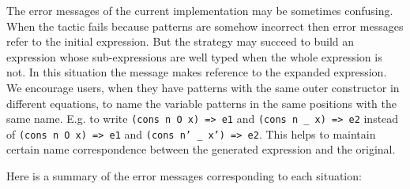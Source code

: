The error messages of the current implementation may be sometimes
confusing.  When the tactic fails because patterns are somehow
incorrect then error messages refer to the initial expression. But the
strategy may succeed to build an expression whose sub-expressions are
well typed when the whole expression is not. In this situation the
message makes reference to the expanded expression.  We encourage
users, when they have patterns with the same outer constructor in
different equations, to name the variable patterns in the same
positions with the same name.  
E.g. to write {\small\texttt{(cons n O x) => e1}} 
and {\small\texttt{(cons n \_ x) => e2}} instead of
{\small\texttt{(cons n O x) => e1}} and 
{\small\texttt{(cons n' \_ x') => e2}}. 
This helps to maintain certain name correspondence between the
generated expression and the original.

Here is a summary of the error messages corresponding to each situation:

